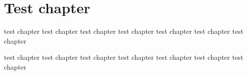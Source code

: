 %
%
%

\chapter{Test chapter}

test chapter test chapter test chapter test chapter test chapter test chapter test chapter

test chapter test chapter test chapter test chapter test chapter test chapter test chapter
